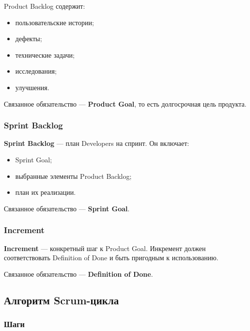 \documentclass[12pt,a4paper]{article}
\begin{document}
Product Backlog содержит:
\begin{itemize}
    \item пользовательские истории;
    \item дефекты;
    \item технические задачи;
    \item исследования;
    \item улучшения.
\end{itemize}

Связанное обязательство --- \textbf{Product Goal}, то есть долгосрочная цель продукта.

\subsubsection{Sprint Backlog}

\textbf{Sprint Backlog} --- план Developers на спринт. Он включает:
\begin{itemize}
    \item Sprint Goal;
    \item выбранные элементы Product Backlog;
    \item план их реализации.
\end{itemize}

Связанное обязательство --- \textbf{Sprint Goal}.

\subsubsection{Increment}

\textbf{Increment} --- конкретный шаг к Product Goal. Инкремент должен соответствовать Definition of Done и быть пригодным к использованию.

Связанное обязательство --- \textbf{Definition of Done}.

\subsection{Алгоритм Scrum-цикла}

\subsubsection*{Шаги}
\end{document}
